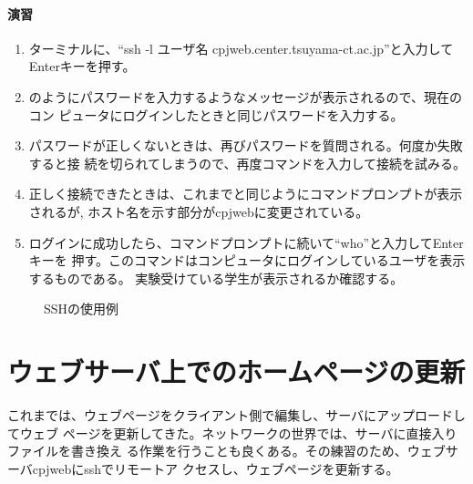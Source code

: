 \paragraph{演習}
\begin{enumerate}
\item ターミナルに、``ssh -l ユーザ名 cpjweb.center.tsuyama-ct.ac.jp''と入力して
      Enterキーを押す。
\item {}のようにパスワードを入力するようなメッセージが表示されるので、現在のコン
      ピュータにログインしたときと同じパスワードを入力する。
\item パスワードが正しくないときは、再びパスワードを質問される。何度か失敗すると接
      続を切られてしまうので、再度コマンドを入力して接続を試みる。
\item 正しく接続できたときは、これまでと同じようにコマンドプロンプトが表示されるが,
      ホスト名を示す部分がcpjwebに変更されている。
\item ログインに成功したら、コマンドプロンプトに続いて``who''と入力してEnterキーを
      押す。このコマンドはコンピュータにログインしているユーザを表示するものである。
      実験受けている学生が表示されるか確認する。
\end{enumerate}

\begin{figure}[htbp]
\begin{center}
\caption{SSHの使用例}
\label{fig:ssh2}
\end{center}
\end{figure}

\section{ウェブサーバ上でのホームページの更新}
これまでは、ウェブページをクライアント側で編集し、サーバにアップロードしてウェブ
ページを更新してきた。ネットワークの世界では、サーバに直接入りファイルを書き換え
る作業を行うことも良くある。その練習のため、ウェブサーバcpjwebにsshでリモートア
クセスし、ウェブページを更新する。

